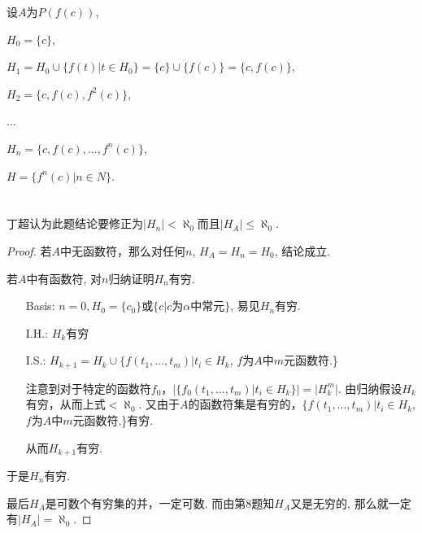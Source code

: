 \documentclass{article}
\begin{document}
设$A$为$P(f(c))$,

$H_0=\{c\}$,

$H_1= H_0 \cup \{f(t)|t\in H_0\}= \{c\}\cup \{f(c)\} =\{c, f(c)\}$,

$H_2=\{c,f(c),f^2(c)\}$,

...

$H_n=\{c,f(c),...,f^n(c)\}$,

$H=\{f^n(c)|n \in N\}$.


\section{}
丁超认为此题结论要修正为$|H_n| < \aleph_0$而且$|H_A| \le \aleph_0$. 
\begin{proof}
若$A$中无函数符，那么对任何$n$, $H_A = H_n = H_0$, 结论成立. 
	
若$A$中有函数符, 对$n$归纳证明$H_n$有穷. 
\begin{itemize}
\item[Basis:]$n=0, H_0=\{c_0\}$或$\{c|c$为$\alpha$中常元$\}$, 易见$H_n$有穷. 

\item[I.H.:] $H_k$有穷

\item[I.S.:] $H_{k+1} = H_k \cup \{ f(t_1,...,t_m)|t_i \in H_k$, $f$为$A$中$m$元函数符.\}

注意到对于特定的函数符$f_0$，$|\{f_0(t_1,...,t_m)|t_i \in H_k\}| = |H_k^m|$. 
由归纳假设$H_k$有穷，从而上式$< \aleph_0$. 又由于$A$的函数符集是有穷的，$\{ f(t_1,...,t_m)|t_i \in H_k$, $f$为$A$中$m$元函数符.\}有穷. 

从而$H_{k+1}$有穷. 


\end{itemize}
于是$H_n$有穷. 

最后$H_A$是可数个有穷集的并，一定可数. 而由第8题知$H_A$又是无穷的, 那么就一定有$|H_A| = \aleph_0$. 

\end{proof}
\end{document}
